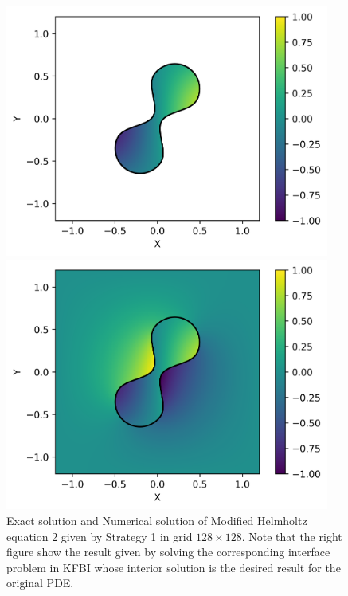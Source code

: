\documentclass{article}
\begin{document}
\begin{figure}[htb]
\centering
\begin{minipage}[t]{0.48\textwidth}
\centering
\includegraphics[width=0.95\textwidth]{MH2_exact.png}
\end{minipage}
\begin{minipage}[t]{0.48\textwidth}
\centering
\includegraphics[width=0.95\textwidth]{MH2_approx.png}
\end{minipage}
\caption{Exact solution and Numerical solution of Modified Helmholtz equation 2 given by Strategy 1 in grid $128 \times 128$. Note that the right figure show the result given by solving the corresponding interface problem in KFBI whose interior solution is the desired result for the original PDE.}
\label{fig:Modified Helmholtz2}
\end{figure}
\end{document}
